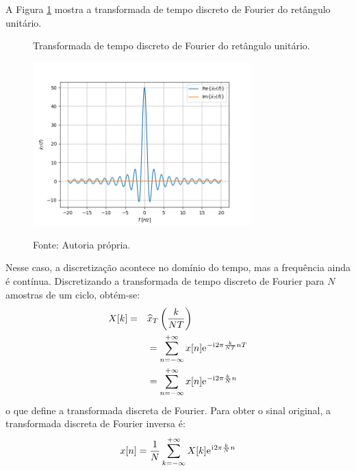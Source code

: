 \documentclass[12pt,a4paper]{report}
\newcommand{\I}{{\mathrm{i}\mkern1mu}}
\newcommand{\euler}{{\mathrm{e}\mkern1mu}}
\begin{document}
  A Figura \ref{fig:discrete_time_fourier_transform} mostra a transformada de tempo discreto de Fourier do
  retângulo unitário.
  \begin{figure}[H]
    \caption{Transformada de tempo discreto de Fourier do retângulo unitário.}
    \centering
    \includegraphics[width=0.75\textwidth]{discrete_time_fourier_transform}
    \label{fig:discrete_time_fourier_transform}
    \caption*{Fonte: Autoria própria.}
  \end{figure}
  Nesse caso, a discretização acontece no domínio do tempo, mas a frequência ainda é contínua. Discretizando a
  transformada de tempo discreto de Fourier para $N$ amostras de um ciclo, obtém-se:
  \begin{equation}
    \begin{split}
      X[k] = &\quad \widehat{x}_T\left(\frac{k}{N T}\right)
      \\ &\quad = \sum_{n = -\infty}^{+\infty} x[n] \euler^{-\I 2 \pi \frac{k}{N T} n T}
      \\ &\quad = \sum_{n = -\infty}^{+\infty} x[n] \euler^{-\I 2 \pi \frac{k}{N} n}
    \end{split}
  \end{equation}
  o que define a transformada discreta de Fourier. Para obter o sinal original, a transformada discreta de
  Fourier inversa é:
  \begin{equation}
    x[n] = \frac{1}{N} \sum_{k = -\infty}^{+\infty} X[k] \euler^{\I 2 \pi \frac{k}{N} n}
  \end{equation}
  
\end{document}
